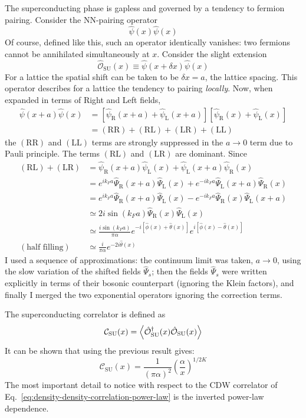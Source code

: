The superconducting phase is gapless and governed by a tendency to fermion pairing. Consider the NN-pairing operator
\[
	\hat \psi(x) \hat \psi(x)
\]
Of course, defined like this, such an operator identically vanishes: two fermions cannot be annihilated simultaneously at $x$. Consider the slight extension
\[
	\hat{\mathcal{O}}_\mathrm{SU}(x) \equiv \hat \psi (x+\delta x) \hat \psi (x)
\]
For a lattice the spatial shift can be taken to be $\delta x = a$, the lattice spacing. This operator describes for a lattice the tendency to pairing \textit{locally}. Now, when expanded in terms of Right and Left fields,
\[
	\begin{aligned}
		\hat \psi (x+a) \hat \psi(x) &= \left[
			\hat \psi_\mathrm{R} (x+a) +
			\hat \psi_\mathrm{L} (x+a)
		\right] \left[
			\hat \psi_\mathrm{R} (x) +
			\hat \psi_\mathrm{L} (x)
		\right] \\
		&= (\mathrm{RR}) + (\mathrm{RL}) + (\mathrm{LR}) + (\mathrm{LL})
	\end{aligned}
\]
the $(\mathrm{RR})$ and $(\mathrm{LL})$ terms are strongly suppressed in the $a \to 0$ term due to Pauli principle. The terms $(\mathrm{RL})$ and $(\mathrm{LR})$ are dominant. Since
\[
	\begin{aligned}
		(\mathrm{RL}) + (\mathrm{LR}) &= \hat \psi_\mathrm{R} (x+a) \hat \psi_\mathrm{L} (x) + \hat \psi_\mathrm{L} (x+a) \hat \psi_\mathrm{R} (x) \\
		&= e^{ik_F a} \hat \Psi_\mathrm{R} (x+a) \hat \Psi_\mathrm{L} (x) + e^{-ik_F a} \hat \Psi_\mathrm{L} (x+a) \hat \Psi_\mathrm{R} (x) \\
		&= e^{ik_F a} \hat \Psi_\mathrm{R} (x+a) \hat \Psi_\mathrm{L} (x) - e^{-ik_F a} \hat \Psi_\mathrm{R} (x) \hat \Psi_\mathrm{L} (x+a)\\
		&\simeq 2i \sin(k_F a) \hat \Psi_\mathrm{R} (x) \hat \Psi_\mathrm{L} (x) \\
		&\simeq \frac{i \sin(k_F a)}{\pi\alpha} e^{-i \left[ \hat \phi(x) + \hat \theta(x) \right] } e^{i \left[ \hat \phi(x) - \hat \theta(x) \right]} \\
		(\text{half filling})&\simeq \frac{i}{\pi\alpha} e^{-2i\hat\theta(x)}
	\end{aligned}
\]
I used a sequence of approximations: the continuum limit was taken, $a \to 0$, using the slow variation of the shifted fields $\hat \Psi_s$; then the fields $\hat \Psi_s$ were written explicitly in terms of their bosonic counterpart (ignoring the Klein factors), and finally I merged the two exponential operators ignoring the correction terms.

The superconducting correlator is defined as
\[
	\mathcal{C}_\mathrm{SU}(x) = \ev{\hat{\mathcal{O}}_\mathrm{SU}^\dagger(x) \hat{\mathcal{O}}_\mathrm{SU}(x)}
\]
It can be shown that using the previous result gives:
\begin{equation}\label{eq:superconducting-correlation-power-law}
	\mathcal{C}_\mathrm{SU}(x) = \frac{1}{(\pi\alpha)^2} \left(
		\frac{\alpha}{x}
	\right)^{1/2K}
\end{equation}
The most important detail to notice with respect to the $\mathrm{CDW}$ correlator of Eq.~\eqref{eq:density-density-correlation-power-law} is the inverted power-law dependence. \todo